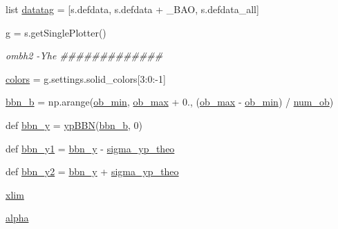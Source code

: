 \begin{DoxyCompactItemize}
\item 
list \mbox{\hyperlink{namespacebbn__yhe_a063490560da67d4aa74baa317b66577a}{datatag}} = \mbox{[}s.\+defdata, s.\+defdata + \textquotesingle{}\+\_\+\+B\+AO\textquotesingle{}, s.\+defdata\+\_\+all\mbox{]}
\item 
\mbox{\hyperlink{namespacebbn__yhe_a28ea3e3cf2288f549b58603f5a80dd23}{g}} = s.\+get\+Single\+Plotter()
\begin{DoxyCompactList}\small\item\em ombh2 -\/\+Yhe \#\#\#\#\#\#\#\#\#\#\#\#\# \end{DoxyCompactList}\item 
\mbox{\hyperlink{namespacebbn__yhe_a68a4915540c5ddfdf951a7612c20358d}{colors}} = g.\+settings.\+solid\+\_\+colors\mbox{[}3\+:0\+:-\/1\mbox{]}
\item 
\mbox{\hyperlink{namespacebbn__yhe_a8da3e95ccabe26e7b02faafa8d0c7d0a}{bbn\+\_\+b}} = np.\+arange(\mbox{\hyperlink{namespacebbn__yhe_aa005d4473664db0db345095282beb1ef}{ob\+\_\+min}}, \mbox{\hyperlink{namespacebbn__yhe_a7ad9cbb8dc27628c6fbf6296bba963ca}{ob\+\_\+max}} + 0., (\mbox{\hyperlink{namespacebbn__yhe_a7ad9cbb8dc27628c6fbf6296bba963ca}{ob\+\_\+max}} -\/ \mbox{\hyperlink{namespacebbn__yhe_aa005d4473664db0db345095282beb1ef}{ob\+\_\+min}}) / \mbox{\hyperlink{namespacebbn__yhe_a3aa1ae9b0ed6bd135e4fc002b7eca1a9}{num\+\_\+ob}})
\item 
def \mbox{\hyperlink{namespacebbn__yhe_a28b53c029dcb7310ef25c077dbf59bab}{bbn\+\_\+y}} = \mbox{\hyperlink{namespacebbn__yhe_a0ae2fc2b1719f17ae48ec9dee3de6728}{yp\+B\+BN}}(\mbox{\hyperlink{namespacebbn__yhe_a8da3e95ccabe26e7b02faafa8d0c7d0a}{bbn\+\_\+b}}, 0)
\item 
def \mbox{\hyperlink{namespacebbn__yhe_a3f8a67b91f6391a7bd8ea269672ac615}{bbn\+\_\+y1}} = \mbox{\hyperlink{namespacebbn__yhe_a28b53c029dcb7310ef25c077dbf59bab}{bbn\+\_\+y}} -\/ \mbox{\hyperlink{namespacebbn__yhe_a06123892f977e5e00eb0e7bcf6866dbb}{sigma\+\_\+yp\+\_\+theo}}
\item 
def \mbox{\hyperlink{namespacebbn__yhe_ae522afab9400241fb8bc86962e60e9b5}{bbn\+\_\+y2}} = \mbox{\hyperlink{namespacebbn__yhe_a28b53c029dcb7310ef25c077dbf59bab}{bbn\+\_\+y}} + \mbox{\hyperlink{namespacebbn__yhe_a06123892f977e5e00eb0e7bcf6866dbb}{sigma\+\_\+yp\+\_\+theo}}
\item 
\mbox{\hyperlink{namespacebbn__yhe_adaa6abf83a5db41a605b66fcf1072747}{xlim}}
\item 
\mbox{\hyperlink{namespacebbn__yhe_aee3ed9037ad3216e40a5e87b91d33f27}{alpha}}
\item 

\end{DoxyCompactItemize}
